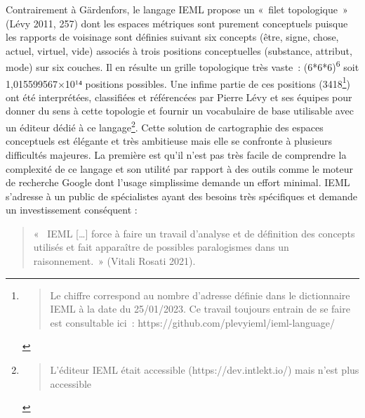 \documentclass[
  letterpaper,
  DIV=11,
  numbers=noendperiod]{scrreprt}
\begin{document}
Contrairement à Gärdenfors, le langage IEML propose un «~filet
topologique~» (Lévy 2011, 257) dont les espaces métriques sont purement
conceptuels puisque les rapports de voisinage sont définies suivant six
concepts (être, signe, chose, actuel, virtuel, vide) associés à trois
positions conceptuelles (substance, attribut, mode) sur six couches. Il
en résulte un grille topologique très vaste~: (6*6*6)\textsuperscript{6}
soit 1,015599567×10¹⁴ positions possibles. Une infime partie de ces
positions (3418\footnote{\begin{quote}
  Le chiffre correspond au nombre d'adresse définie dans le dictionnaire
  IEML à la date du 25/01/2023. Ce travail toujours entrain de se faire
  est consultable ici~: https://github.com/plevyieml/ieml-language/
  \end{quote}}) ont été interprétées, classifiées et référencées par
Pierre Lévy et ses équipes pour donner du sens à cette topologie et
fournir un vocabulaire de base utilisable avec un éditeur dédié à ce
langage\footnote{\begin{quote}
  L'éditeur IEML était accessible (https://dev.intlekt.io/) mais n'est
  plus accessible
  \end{quote}}. Cette solution de cartographie des espaces conceptuels
est élégante et très ambitieuse mais elle se confronte à plusieurs
difficultés majeures. La première est qu'il n'est pas très facile de
comprendre la complexité de ce langage et son utilité par rapport à des
outils comme le moteur de recherche Google dont l'usage simplissime
demande un effort minimal. IEML s'adresse à un public de spécialistes
ayant des besoins très spécifiques et demande un investissement
conséquent :

\begin{quote}
«~ IEML {[}\ldots{]} force à faire un travail d'analyse et de définition
des concepts utilisés et fait apparaître de possibles paralogismes dans
un raisonnement.~» (Vitali Rosati 2021).
\end{quote}
\end{document}
